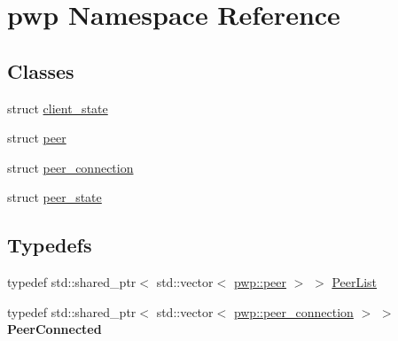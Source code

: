 \hypertarget{namespacepwp}{}\section{pwp Namespace Reference}
\label{namespacepwp}
\subsection*{Classes}
\begin{DoxyCompactItemize}
\item 
struct \hyperlink{structpwp_1_1client__state}{client\+\_\+state}
\item 
struct \hyperlink{structpwp_1_1peer}{peer}
\item 
struct \hyperlink{structpwp_1_1peer__connection}{peer\+\_\+connection}
\item 
struct \hyperlink{structpwp_1_1peer__state}{peer\+\_\+state}
\end{DoxyCompactItemize}
\subsection*{Typedefs}
\begin{DoxyCompactItemize}
\item 
typedef std\+::shared\+\_\+ptr$<$ std\+::vector$<$ \hyperlink{structpwp_1_1peer}{pwp\+::peer} $>$ $>$ \hyperlink{namespacepwp_ad07fa6df116b205302ad5ec172277184}{Peer\+List}
\item 
\mbox{\label{namespacepwp_a174e8f020062fa10258b0d28f00d79ff}} 
typedef std\+::shared\+\_\+ptr$<$ std\+::vector$<$ \hyperlink{structpwp_1_1peer__connection}{pwp\+::peer\+\_\+connection} $>$ $>$ {\bfseries Peer\+Connected}
\end{DoxyCompactItemize}
